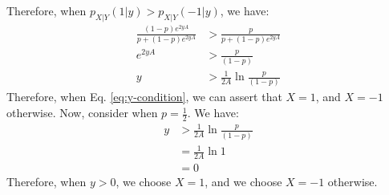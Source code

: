 \documentclass[journal,12pt,twocolumn]{IEEEtran}
\renewcommand\thesection{\arabic{section}}
\begin{document}
\begin{enumerate}[label=\thesection.\arabic*
,ref=\thesection.\theenumi]
\begin{enumerate}[label=\thesection.\arabic*
,ref=\thesection.\theenumi]
Therefore, when $ p_{X|Y}(1|y) >  p_{X|Y}(-1|y)$, we have:
\begin{align}
    \frac{\left(1-p\right) e^{2yA}}{p + \left(1-p\right) e^{2yA}} &> \frac{p}{p + \left(1-p\right) e^{2yA}} \\
    e^{2yA} &> \frac{p}{\left(1-p\right)} \\
    \label{eq:y-condition}
    y &> \frac{1}{2A} \ln{\frac{p}{\left(1-p\right)}}
\end{align}
Therefore, when Eq. \eqref{eq:y-condition}, we can assert that $X = 1$, and $X = -1$ otherwise.
Now, consider when $p = \frac{1}{2} $.
We have:
\begin{align}
    y &> \frac{1}{2A} \ln{\frac{p}{\left(1-p\right)}} \\
    &= \frac{1}{2A} \ln{1} \\
    &= 0
\end{align}
Therefore, when $y > 0$, we choose $X = 1$, and we choose $X = -1$ otherwise.


		\end{enumerate}

\end{enumerate}
\end{document}
